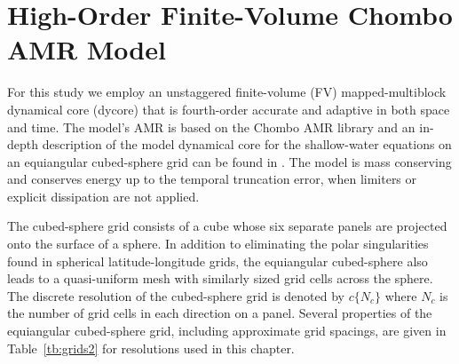 \section{High-Order Finite-Volume Chombo AMR Model}
\label{sec:modelintro} 
  For this study we employ an unstaggered finite-volume (FV) mapped-multiblock 
  dynamical core (dycore) that is fourth-order accurate and adaptive in both 
  space and time. The model's AMR is based on the Chombo AMR 
  library \citep{Adams:2015gd} and an in-depth description of the model 
  dynamical core for the shallow-water equations on an equiangular cubed-sphere 
  grid can be found in \cite{mccorquodale2015adaptive}. The model is mass 
  conserving and conserves energy up to the temporal truncation error, when 
  limiters or explicit dissipation are not applied. 
  
  The cubed-sphere grid consists of a cube whose six separate panels are 
  projected onto the surface of a sphere. In addition to eliminating the polar 
  singularities found in spherical latitude-longitude grids, the equiangular cubed-sphere 
  also leads to a quasi-uniform mesh with similarly sized grid cells across the sphere. 
  The discrete resolution of the cubed-sphere grid is denoted by $c\{N_c\}$ 
  where $N_c$ is the number of grid cells in each direction on a panel. Several 
  properties of the equiangular cubed-sphere grid, including approximate grid 
  spacings, are given in Table~\ref{tb:grids2} for resolutions used in this chapter. 

